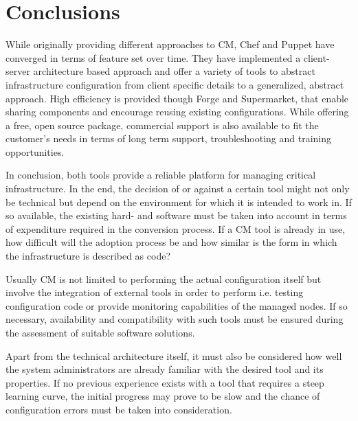 \section{Conclusions}

While originally providing different approaches to CM, Chef and Puppet have converged in terms of feature set over time. They have implemented a client-server architecture based approach and offer a variety of tools to abstract infrastructure configuration from client specific details to a generalized, abstract approach. High efficiency is provided though Forge and Supermarket, that enable sharing components and encourage reusing existing configurations. While offering a free, open source package, commercial support is also available to fit the customer's needs in terms of long term support, troubleshooting and training opportunities.


In conclusion, both tools provide a reliable platform for managing critical infrastructure. In the end, the decision of or against a certain tool might not only be technical but depend on the environment for which it is intended to work in. If so available, the existing hard- and software must be taken into account in terms of expenditure required in the conversion process. If a CM tool is already in use, how difficult will the adoption process be and how similar is the form in which the infrastructure is described as code?

Usually CM is not limited to performing the actual configuration itself but involve the integration of external tools in order to perform i.e. testing configuration code or provide monitoring capabilities of the managed nodes. If so necessary, availability and compatibility with such tools must be ensured during the assessment of suitable software solutions.

Apart from the technical architecture itself, it must also be considered how well the system administrators are already familiar with the desired tool and its properties. If no previous experience exists with a tool that requires a steep learning curve, the initial progress may prove to be slow and the chance of configuration errors must be taken into consideration.